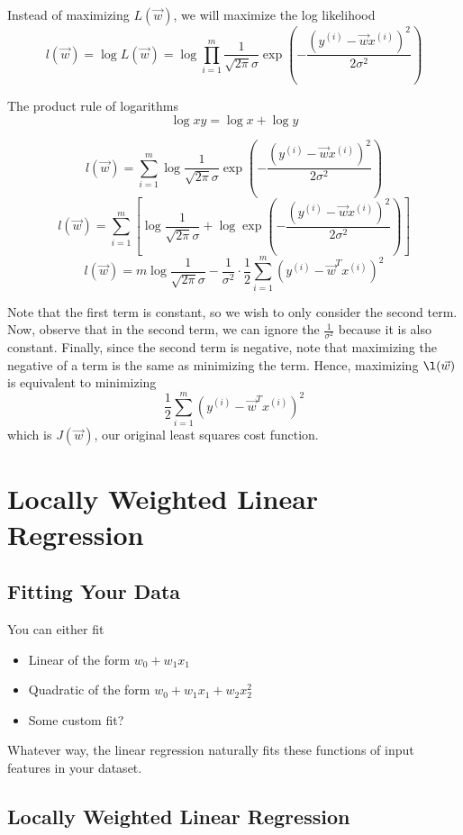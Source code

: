 \documentclass[12pt]{scrartcl}
\begin{document}
Instead of maximizing $L(\vec{w})$, we will maximize the log likelihood
\[l(\vec{w}) = \log L(\vec{w}) = \log \prod_{i=1}^m \frac{1}{\sqrt{2\pi}\sigma }\exp(-\frac{(y^{(i)} - \vec{w}x^{(i)})^2}{2\sigma^2})\]
\begin{note}
    The product rule of logarithms
    \[\log xy = \log x + \log y\]
\end{note}
\[l(\vec{w}) = \sum_{i=1}^m \log \frac{1}{\sqrt{2\pi}\sigma }\exp(-\frac{(y^{(i)} - \vec{w}x^{(i)})^2}{2\sigma^2})\]
\[l(\vec{w}) = \sum_{i=1}^m \left[\log \frac{1}{\sqrt{2\pi}\sigma } + \log \exp(-\frac{(y^{(i)} - \vec{w}x^{(i)})^2}{2\sigma^2})\right]\]
\[l(\vec{w}) = m \log \frac{1}{\sqrt{2\pi}\sigma} - \frac{1}{\sigma^2} \cdot \frac{1}{2}\sum_{i=1}^m (y^{(i)} - \vec{w}^Tx^{(i)})^2\]
\begin{note}
    Note that the first term is constant, so we wish to only consider the second term. Now, observe that in the second term, we can ignore the $\frac{1}{\sigma^2}$ because it is also constant. Finally, since the second term is negative, note that maximizing the negative of a term is the same as minimizing the term. Hence, maximizing $\l(\vec{w})$ is equivalent to minimizing
    \[\frac{1}{2}\sum_{i=1}^m(y^{(i)} - \vec{w}^Tx^{(i)})^2\]
    which is $J(\vec{w})$, our original least squares cost function.
\end{note}

\section{Locally Weighted Linear Regression}

\subsection{Fitting Your Data}

You can either fit 
\begin{itemize}
    \item Linear of the form $w_0 + w_1x_1$
    \item Quadratic of the form $w_0 + w_1x_1 + w_2x_2^2$
    \item Some custom fit?
\end{itemize}
Whatever way, the linear regression naturally fits these functions of input features in your dataset.

\subsection{Locally Weighted Linear Regression}
\end{document}
